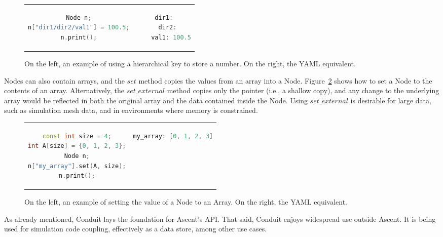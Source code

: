 \begin{figure}
\begin{tabular}{cc}
  \begin{minipage}{.5\textwidth}
  \centering
    \begin{lstlisting}[language=C++]
Node n;
n["dir1/dir2/val1"] = 100.5;
n.print();
    \end{lstlisting}
  \end{minipage}
  &
  \begin{minipage}{.5\textwidth}
  \centering
  \begin{lstlisting}[language=C++]
dir1:
  dir2:
    val1: 100.5
  \end{lstlisting}
  \end{minipage}
\end{tabular}
\caption{\label{ex:2}On the left, an example of using a hierarchical key to store a number. On the right, the YAML equivalent.}
\end{figure}

Nodes can also contain arrays, and the $set$ method
copies the values from an array into a Node.
%
Figure~\ref{ex:3} shows how to set a Node to the contents of an array.
%
Alternatively, the $set\_external$ method copies only the pointer (i.e., a shallow copy),
and any change to the underlying array would be reflected in both the original
array and the data contained inside the Node.
%
Using $set\_external$ is desirable for large data, such as simulation mesh data,
and in environments where memory is constrained.

\begin{figure}
\begin{tabular}{cc}
  \begin{minipage}{.5\textwidth}
  \centering
    \begin{lstlisting}[language=C++]
const int size = 4;
int A[size] = {0, 1, 2, 3};
Node n;
n["my_array"].set(A, size);
n.print();
    \end{lstlisting}
  \end{minipage}
  &
  \begin{minipage}{.5\textwidth}
  \centering
  \begin{lstlisting}[language=C++]
my_array: [0, 1, 2, 3]
  \end{lstlisting}
  \end{minipage}
\end{tabular}

\caption{\label{ex:3}On the left, an example of setting the value of a Node to an Array. On the right, the YAML equivalent.}
\end{figure}

As already mentioned, Conduit lays the foundation for Ascent's API.
%
That said, Conduit enjoys widespread use outside Ascent.
%
It is being used for simulation code coupling, effectively as a data store, among
other use cases.


